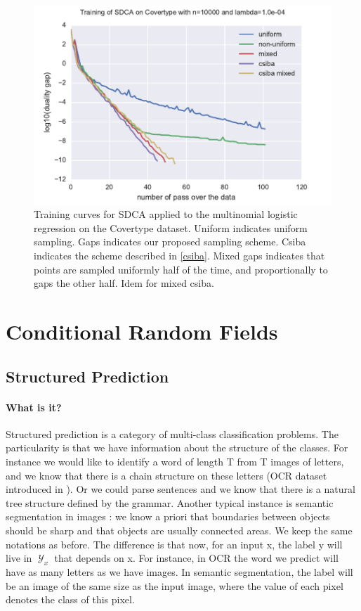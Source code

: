 \documentclass{article}
\DeclareMathOperator{\1}{\mathbb{1}}
\DeclareMathOperator{\Y}{\mathcal{Y}}
\begin{document}
\begin{figure}[ht]
	\center
	\includegraphics[width=.8\textwidth]{images/20170914_065817_covertype_perf.pdf}
	\caption{Training curves for SDCA applied to the multinomial logistic regression on the Covertype dataset. Uniform indicates uniform sampling. Gaps indicates our proposed sampling scheme. Csiba indicates the scheme described in \ref{csiba}. Mixed gaps indicates that points are sampled uniformly half of the time, and proportionally to gaps the other half. Idem for mixed csiba.}
	\label{training covertype}
\end{figure}

\clearpage
\section{Conditional Random Fields}

\subsection{Structured Prediction}

\paragraph{What is it?}
Structured prediction is a category of multi-class classification problems.
The particularity is that we have information about the structure of the classes.
For instance we would like to identify a word of length T from T images of letters, and we know that there is a chain structure on these letters (OCR dataset introduced in \cite{taskar_max-margin_2004}).
Or we could parse sentences and we know that there is a natural tree structure defined by the grammar.
Another typical instance is semantic segmentation in images : we know a priori that boundaries between objects should be sharp and that objects are usually connected areas.
We keep the same notations as before.
The difference is that now, for an input x, the label y will live in $\Y_x$ that depends on x.
For instance, in OCR the word we predict will have as many letters as we have images.
In semantic segmentation, the label will be an image of the same size as the input image, where the value of each pixel denotes the class of this pixel. 
\end{document}
